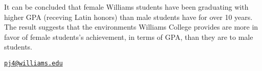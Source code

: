 It can be concluded that female Williams students have been graduating
with higher GPA (receving Latin honors) than male students have for over
10 years. The result suggests that the environments Williams College
provides are more in favor of female students's achievement, in terms of
GPA, than they are to male students.



\address{%
Panchanok Jumrustanasan '19\\
Economics and Computer Science\\
Williams College\\ Williamstown, MA\\
}
\href{mailto:pj4@williams.edu}{\nolinkurl{pj4@williams.edu}}

